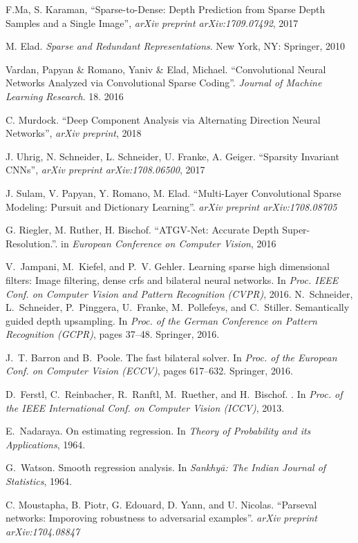 \begin{thebibliography}{99}
  F.Ma, S. Karaman, ``Sparse-to-Dense: Depth Prediction from Sparse Depth Samples and a Single Image'', \emph{arXiv preprint arXiv:1709.07492}, 2017
  
  M. Elad. \emph{Sparse and Redundant Representations}. New York, NY: Springer, 2010

  Vardan, Papyan \& Romano, Yaniv \& Elad, Michael. ``Convolutional Neural Networks Analyzed via Convolutional Sparse Coding''. \emph{Journal of Machine Learning Research}. 18. 2016

  C. Murdock. ``Deep Component Analysis via Alternating Direction Neural Networks'', \emph{arXiv preprint}, 2018

  J. Uhrig, N. Schneider, L. Schneider, U. Franke, A. Geiger. ``Sparsity Invariant CNNs'', \emph{arXiv preprint arXiv:1708.06500}, 2017

  J. Sulam, V. Papyan, Y. Romano, M. Elad. ``Multi-Layer Convolutional Sparse Modeling: Pursuit and Dictionary Learning''. \emph{arXiv preprint arXiv:1708.08705}

  G. Riegler, M. Ruther, H. Bischof. ``ATGV-Net: Accurate Depth Super-Resolution.''. in \emph{European Conference on Computer Vision}, 2016

  V.~Jampani, M.~Kiefel, and P.~V. Gehler.
  \newblock Learning sparse high dimensional filters: Image filtering, dense crfs
  and bilateral neural networks.
  \newblock In {\em Proc. IEEE Conf. on Computer Vision and Pattern Recognition
    (CVPR)}, 2016.
  N.~Schneider, L.~Schneider, P.~Pinggera, U.~Franke, M.~Pollefeys, and
  C.~Stiller.
  \newblock Semantically guided depth upsampling.
  \newblock In {\em Proc. of the German Conference on Pattern Recognition
    (GCPR)}, pages 37--48. Springer, 2016.

J.~T. Barron and B.~Poole.
\newblock The fast bilateral solver.
\newblock In {\em Proc. of the European Conf. on Computer Vision (ECCV)}, pages
  617--632. Springer, 2016.

D.~Ferstl, C.~Reinbacher, R.~Ranftl, M.~Ruether, and H.~Bischof.
.
\newblock In {\em Proc. of the IEEE International Conf. on Computer Vision
  (ICCV)}, 2013.

E.~Nadaraya.
\newblock On estimating regression.
\newblock In {\em Theory of Probability and its Applications}, 1964.

G.~Watson.
\newblock Smooth regression analysis.
\newblock In {\em Sankhyā: The Indian Journal of Statistics}, 1964.

  C. Moustapha, B. Piotr, G. Edouard, D. Yann, and U. Nicolas. ``Parseval networks: Imporoving robustness to adversarial examples''. \emph{arXiv preprint arXiv:1704.08847}
\end{thebibliography}